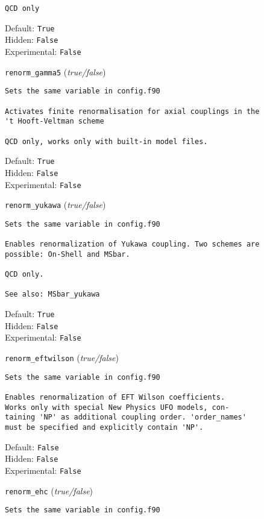 \begin{basedescript}{\desclabelstyle{\pushlabel}}
\begin{verbatim}
QCD only
\end{verbatim}
Default: \verb|True|
\\Hidden: \verb|False|
\\Experimental: \verb|False|
\\\item[\colorbox{gray!30}{\texttt{renorm\_gamma5}}] (\textit{true/false})
\begin{verbatim}
Sets the same variable in config.f90

Activates finite renormalisation for axial couplings in the
't Hooft-Veltman scheme

QCD only, works only with built-in model files.
\end{verbatim}
Default: \verb|True|
\\Hidden: \verb|False|
\\Experimental: \verb|False|
\\\item[\colorbox{gray!30}{\texttt{renorm\_yukawa}}] (\textit{true/false})
\begin{verbatim}
Sets the same variable in config.f90

Enables renormalization of Yukawa coupling. Two schemes are
possible: On-Shell and MSbar.

QCD only.

See also: MSbar_yukawa
\end{verbatim}
Default: \verb|True|
\\Hidden: \verb|False|
\\Experimental: \verb|False|
\\\item[\colorbox{gray!30}{\texttt{renorm\_eftwilson}}] (\textit{true/false})
\begin{verbatim}
Sets the same variable in config.f90

Enables renormalization of EFT Wilson coefficients.
Works only with special New Physics UFO models, con-
taining 'NP' as additional coupling order. 'order_names'
must be specified and explicitly contain 'NP'.
\end{verbatim}
Default: \verb|False|
\\Hidden: \verb|False|
\\Experimental: \verb|False|
\\\item[\colorbox{gray!30}{\texttt{renorm\_ehc}}] (\textit{true/false})
\begin{verbatim}
Sets the same variable in config.f90


\end{verbatim}
\end{basedescript}
